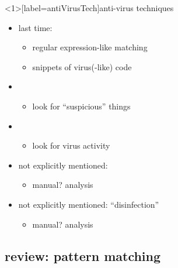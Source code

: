 \begin{frame}<1>[label=antiVirusTech]{anti-virus techniques}
    \begin{itemize}
    \item last time: 
        \begin{itemize}
        \item regular expression-like matching
        \item snippets of virus(-like) code
        \end{itemize}
    \item {}
        \begin{itemize}
        \item look for ``suspicious'' things
        \end{itemize}
    \item {}
        \begin{itemize}
        \item look for virus activity
        \end{itemize}
    \item not explicitly mentioned: 
        \begin{itemize}
        \item manual? analysis
        \end{itemize}
    \item not explicitly mentioned: ``disinfection''
        \begin{itemize}
        \item manual? analysis
        \end{itemize}
    \end{itemize}
\end{frame}

\subsection{review: pattern matching}


